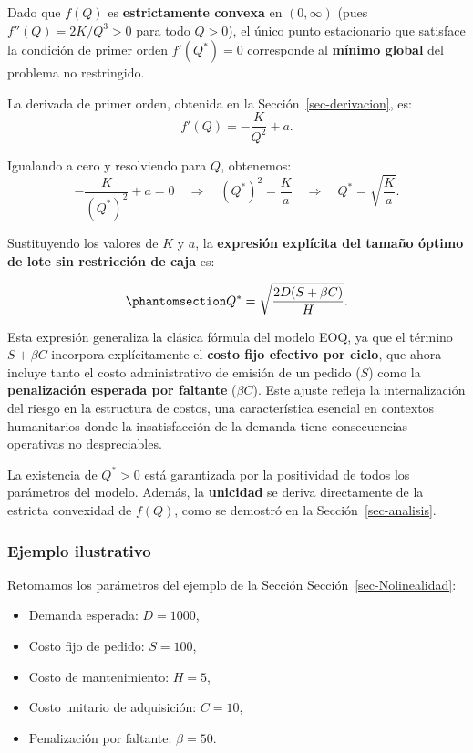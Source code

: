 \documentclass[
  spanish,
  us-letterpaper,
]{scrreprt}
\providecommand{\tightlist}{%
  \setlength{\itemsep}{0pt}\setlength{\parskip}{0pt}}
\numberwithin{equation}{section}
\begin{document}
Dado que \(f(Q)\) es \textbf{estrictamente convexa} en \((0, \infty)\)
(pues \(f''(Q) = 2K/Q^3 > 0\) para todo \(Q > 0\)), el único punto
estacionario que satisface la condición de primer orden \(f'(Q^*) = 0\)
corresponde al \textbf{mínimo global} del problema no restringido.

La derivada de primer orden, obtenida en la
Sección~\ref{sec-derivacion}, es: \[
f'(Q) = -\frac{K}{Q^2} + a.
\]

Igualando a cero y resolviendo para \(Q\), obtenemos: \[
-\frac{K}{(Q^*)^2} + a = 0
\quad\Longrightarrow\quad
(Q^*)^2 = \frac{K}{a}
\quad\Longrightarrow\quad
Q^* = \sqrt{\frac{K}{a}}.
\]

Sustituyendo los valores de \(K\) y \(a\), la \textbf{expresión
explícita del tamaño óptimo de lote sin restricción de caja} es:

\begin{equation}\phantomsection\label{eq-Qstar_sin_caja}{
Q^* = \sqrt{\frac{2 D (S + \beta C)}{H}}.
}\end{equation}

Esta expresión generaliza la clásica fórmula del modelo EOQ, ya que el
término \(S + \beta C\) incorpora explícitamente el \textbf{costo fijo
efectivo por ciclo}, que ahora incluye tanto el costo administrativo de
emisión de un pedido (\(S\)) como la \textbf{penalización esperada por
faltante} (\(\beta C\)). Este ajuste refleja la internalización del
riesgo en la estructura de costos, una característica esencial en
contextos humanitarios donde la insatisfacción de la demanda tiene
consecuencias operativas no despreciables.

La existencia de \(Q^* > 0\) está garantizada por la positividad de
todos los parámetros del modelo. Además, la \textbf{unicidad} se deriva
directamente de la estricta convexidad de \(f(Q)\), como se demostró en
la Sección~\ref{sec-analisis}.

\subsubsection{Ejemplo ilustrativo}\label{ejemplo-ilustrativo-6}

Retomamos los parámetros del ejemplo de la Sección
Sección~\ref{sec-Nolinealidad}:

\begin{itemize}
\tightlist
\item
  Demanda esperada: \(D = 1000\),
\item
  Costo fijo de pedido: \(S = 100\),
\item
  Costo de mantenimiento: \(H = 5\),
\item
  Costo unitario de adquisición: \(C = 10\),
\item
  Penalización por faltante: \(\beta = 50\).
\end{itemize}
\end{document}
